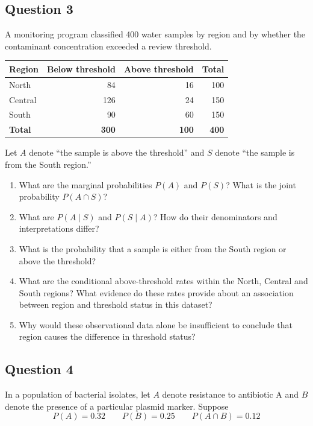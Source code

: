 \documentclass[10pt,letterpaper]{article}
\providecommand{\tightlist}{%
  \setlength{\itemsep}{0pt}\setlength{\parskip}{0pt}}
\begin{document}
\subsection*{Question 3}
A monitoring program classified 400 water samples by region and by whether the contaminant concentration exceeded a review threshold.

\begin{longtable}[]{@{}lrrr@{}}
\toprule\noalign{}
Region & Below threshold & Above threshold & Total \\
\midrule\noalign{}
\endhead
\bottomrule\noalign{}
\endlastfoot
North & 84 & 16 & 100 \\
Central & 126 & 24 & 150 \\
South & 90 & 60 & 150 \\
\textbf{Total} & \textbf{300} & \textbf{100} & \textbf{400} \\
\end{longtable}

Let \(A\) denote ``the sample is above the threshold'' and \(S\) denote ``the sample is from the South region.''

\begin{enumerate}
\def\labelenumi{\arabic{enumi}.}
\tightlist
	\item What are the marginal probabilities \(P(A)\) and \(P(S)\)? What is the joint probability \(P(A\cap S)\)?
	\item What are \(P(A\mid S)\) and \(P(S\mid A)\)? How do their denominators and interpretations differ?
	\item What is the probability that a sample is either from the South region or above the threshold?
	\item What are the conditional above-threshold rates within the North, Central and South regions? What evidence do these rates provide about an association between region and threshold status in this dataset?
	\item Why would these observational data alone be insufficient to conclude that region causes the difference in threshold status? 
\end{enumerate}

\subsection*{Question 4}
In a population of bacterial isolates, let \(A\) denote resistance to antibiotic A and \(B\) denote the presence of a particular plasmid marker. Suppose
\[
	P(A)=0.32 \qquad P(B)=0.25 \qquad P(A\cap B)=0.12
\]
\end{document}
